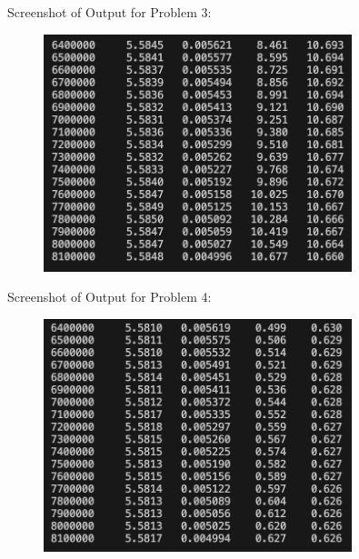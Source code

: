 \documentclass{report}
\begin{document}
\centerline{Screenshot of Output for Problem 3:}
\begin{figure}[H]
    \centering
    \includegraphics[width=0.8\textwidth]{Screenshot_3.png}
\end{figure}

\centerline{Screenshot of Output for Problem 4:}
\begin{figure}[H]
    \centering
    \includegraphics[width=0.8\textwidth]{Screenshot_4.png}
\end{figure}

\pagebreak
\end{document}

